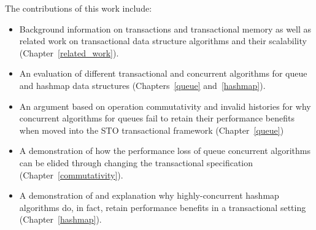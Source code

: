 The contributions of this work include: 
\begin{itemize}
    \item Background information on transactions and transactional memory as well as related work on transactional data structure algorithms and their scalability (Chapter~\ref{related_work}).
    \item An evaluation of different transactional and concurrent algorithms for queue and hashmap data structures (Chapters~\ref{queue} and~\ref{hashmap}).
    \item An argument based on operation commutativity and invalid histories for why concurrent algorithms for queues fail to retain their performance benefits when moved into the STO transactional framework (Chapter~\ref{queue})
    \item A demonstration of how the performance loss of queue concurrent algorithms can be elided through changing the transactional specification (Chapter~\ref{commutativity}).
    \item A demonstration of and explanation why highly-concurrent hashmap algorithms do, in fact, retain performance benefits in a transactional setting (Chapter~\ref{hashmap}).
\end{itemize}
